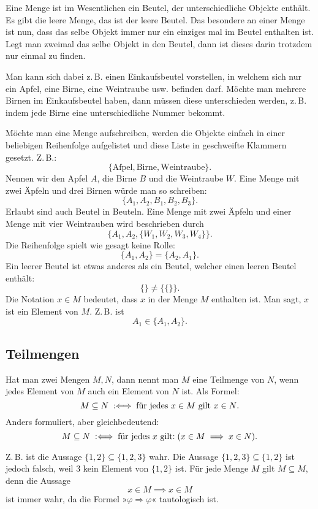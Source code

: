 Eine Menge ist im Wesentlichen ein Beutel, der unterschiedliche
Objekte enthält. Es gibt die leere Menge, das ist der leere Beutel.
Das besondere an einer Menge ist nun, dass das selbe Objekt immer
nur ein einziges mal im Beutel enthalten ist. Legt man zweimal
das selbe Objekt in den Beutel, dann ist dieses darin trotzdem nur
einmal zu finden.

Man kann sich dabei z.\,B. einen Einkaufsbeutel vorstellen,
in welchem sich nur ein Apfel, eine Birne, eine Weintraube usw.
befinden darf. Möchte man mehrere Birnen im Einkaufsbeutel haben,
dann müssen diese unterschieden werden, z.\,B. indem jede Birne
eine unterschiedliche Nummer bekommt.

Möchte man eine Menge aufschreiben, werden die Objekte einfach
in einer beliebigen Reihenfolge aufgelistet und diese Liste in
geschweifte Klammern gesetzt. Z.\,B.:%
\[\{\mathrm{Afpel}, \mathrm{Birne}, \mathrm{Weintraube}\}.\]
Nennen wir den Apfel $A$, die Birne $B$
und die Weintraube $W$. Eine Menge mit zwei Äpfeln und drei
Birnen würde man so schreiben:%
\[\{A_1, A_2, B_1, B_2, B_3\}.\]
Erlaubt sind auch Beutel in Beuteln. Eine Menge mit zwei Äpfeln
und einer Menge mit vier Weintrauben wird beschrieben durch%
\[\{A_1, A_2, \{W_1,W_2,W_3,W_4\}\}.\]
Die Reihenfolge spielt wie gesagt keine Rolle:%
\[\{A_1,A_2\} = \{A_2,A_1\}.\]
Ein leerer Beutel ist etwas anderes als ein Beutel, welcher einen
leeren Beutel enthält:%
\[\{\} \ne \{\{\}\}.\]
Die Notation $x\in M$ bedeutet, dass $x$ in der Menge $M$ enthalten
ist. Man sagt, $x$ ist ein Element von $M$. Z.\,B. ist
\[A_1\in\{A_1,A_2\}.\]

\newpage
\subsection{Teilmengen}

\begin{Definition}[Teilmengenrelation]
Hat man zwei Mengen $M,N$, dann nennt man $M$ eine Teilmenge von $N$,
wenn jedes Element von $M$ auch ein Element von $N$ ist.
Als Formel:
\[M\subseteq N\;:\Longleftrightarrow\; \text{für jedes $x\in M$ gilt $x\in N$}.\]
Anders formuliert, aber gleichbedeutend:
\[M\subseteq N\;:\Longleftrightarrow\; \text{für jedes $x$ gilt:}\; (x\in M\implies x\in N).\]
\end{Definition}
Z.\,B. ist die Aussage $\{1,2\}\subseteq\{1,2,3\}$ wahr.
Die Aussage $\{1,2,3\}\subseteq\{1,2\}$ ist jedoch falsch,
weil $3$ kein Element von $\{1,2\}$ ist. Für jede Menge $M$ gilt
$M\subseteq M$, denn die Aussage
\[x\in M\implies x\in M\]
ist immer wahr, da die Formel »$\varphi\Rightarrow\varphi$«
tautologisch ist.

